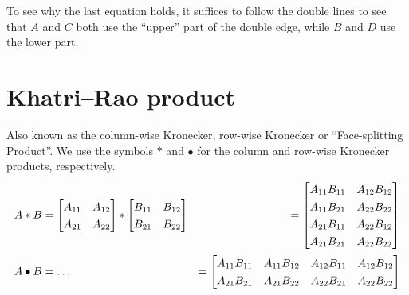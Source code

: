 To see why the last equation holds, it suffices to follow the double lines to see that $A$ and $C$ both use the ``upper'' part of the double edge, while $B$ and $D$ use the lower part.

\section{Khatri–Rao product}
Also known as the column-wise Kronecker, row-wise Kronecker or ``Face-splitting Product''.
We use the symbols $\ast$ and $\bullet$ for the column and row-wise Kronecker products, respectively.
\begin{align*}
   A \ast B &=
   \renewcommand*{\arraystretch}{1.3}
   \begin{bmatrix}
      A_{11} & A_{12} \\
      A_{21} & A_{22}
   \end{bmatrix}
   \ast
   \renewcommand*{\arraystretch}{1.3}
   \begin{bmatrix}
      B_{11} & B_{12} \\
      B_{21} & B_{22}
   \end{bmatrix}
            &=
   \renewcommand*{\arraystretch}{1.3}
   \begin{bmatrix}
      A_{11} B_{11} & A_{12} B_{12} \\
      A_{11} B_{21} & A_{22} B_{22} \\
      A_{21} B_{11} & A_{22} B_{12} \\
      A_{21} B_{21} & A_{22} B_{22}
   \end{bmatrix}
   \\
   A \bullet B &= \dots
            &=
   \renewcommand*{\arraystretch}{1.3}
   \begin{bmatrix}
      A_{11}  B_{11} & A_{11} B_{12} & A_{12} B_{11} & A_{12} B_{12} \\
      A_{21}  B_{21} & A_{21} B_{22} & A_{22} B_{21} & A_{22} B_{22}
   \end{bmatrix}
\end{align*}

